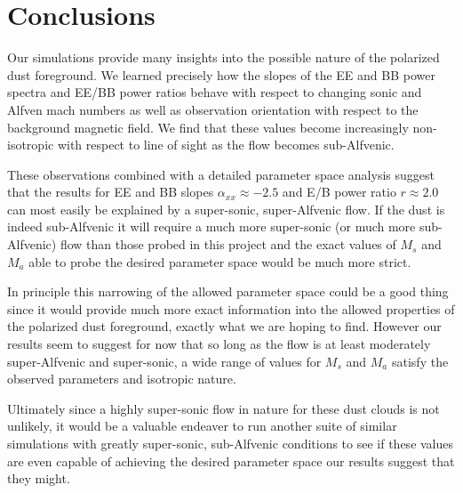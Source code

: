 \section{Conclusions}

Our simulations provide many insights into the possible nature of the polarized
dust foreground. We learned precisely how the slopes of the EE and BB power
spectra and EE/BB power ratios behave with respect to changing sonic and Alfven
mach numbers as well as observation orientation with respect to the background
magnetic field. We find that these values become increasingly non-isotropic with
respect to line of sight as the flow becomes sub-Alfvenic. 

These observations combined with a detailed parameter space analysis suggest that the
\citep{Planck18XI} results for EE and BB slopes $\alpha_{xx} \approx -2.5$ and
E/B power ratio $r \approx 2.0$ can most easily be explained by a super-sonic,
super-Alfvenic flow. If the dust is indeed sub-Alfvenic it will require a much
more super-sonic (or much more sub-Alfvenic) flow than those probed in this
project and the exact values of $M_s$ and $M_a$ able to probe the desired
parameter space would be much more strict.

In principle this narrowing of the allowed parameter space could be a good thing
since it would provide much more exact information into the allowed properties
of the polarized dust foreground, exactly what we are hoping to find. However
our results seem to suggest for now that so long as the flow is at least
moderately super-Alfvenic and super-sonic, a wide range of values for $M_s$ and
$M_a$ satisfy the observed parameters and isotropic nature.

Ultimately since a highly super-sonic flow in nature for these dust clouds is not unlikely,
it would be a valuable endeaver to run another suite of similar simulations with
greatly super-sonic, sub-Alfvenic conditions to see if these values are even
capable of achieving the desired parameter space our results suggest that they
might. 
